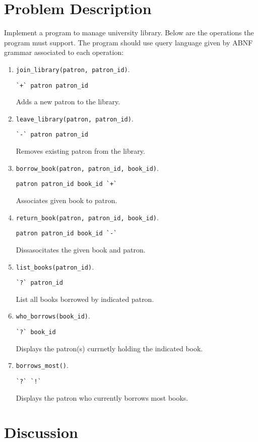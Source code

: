 \documentclass[11pt]{article}
\begin{document}
\section{Problem Description}
\label{sec-1}
Implement a program to manage university library.  Below are the operations
the program must support.  The program should use query language given by ABNF
grammar associated to each operation:
\begin{enumerate}
\item \texttt{join\_library(patron, patron\_id)}.
\begin{verbatim}
`+` patron patron_id
\end{verbatim}
Adds a new patron to the library.
\item \texttt{leave\_library(patron, patron\_id)}.
\begin{verbatim}
`-` patron patron_id
\end{verbatim}
Removes existing patron from the library.
\item \texttt{borrow\_book(patron, patron\_id, book\_id)}.
\begin{verbatim}
patron patron_id book_id `+`
\end{verbatim}
Associates given book to patron.
\item \texttt{return\_book(patron, patron\_id, book\_id)}.
\begin{verbatim}
patron patron_id book_id `-`
\end{verbatim}
Dissasocitates the given book and patron.
\item \texttt{list\_books(patron\_id)}.
\begin{verbatim}
`?` patron_id
\end{verbatim}
List all books borrowed by indicated patron.
\item \texttt{who\_borrows(book\_id)}.
\begin{verbatim}
`?` book_id
\end{verbatim}
Displays the patron(s) currnetly holding the indicated book.
\item \texttt{borrows\_most()}.
\begin{verbatim}
`?` `!`
\end{verbatim}
Displays the patron who currently borrows most books.
\end{enumerate}

\section{Discussion}
\label{sec-2}
\end{document}
